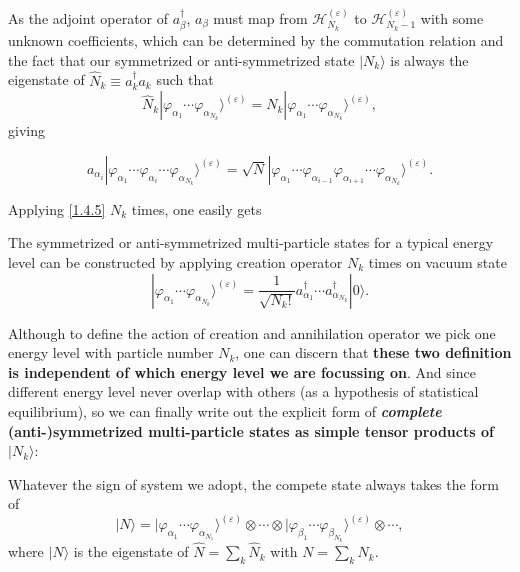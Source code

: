 \documentclass[b5paper,10pt,UTF8]{book}
\numberwithin{equation}{section}
\begin{document}
 		As the adjoint operator of $a^\dagger_\beta$, $a_\beta$ must map from $\mathcal{H}_{N_k}^{(\varepsilon)}$ to $\mathcal{H}_{N_k-1}^{(\varepsilon)}$ with some unknown coefficients, which can be determined by the commutation relation and the fact that our symmetrized or anti-symmetrized state $|N_k\rangle$ is always the eigenstate of $\hat{N}_k\equiv a^\dagger_k a_k$ such that
 		\begin{equation}\label{1.4.4}
 			\hat{N}_k|\varphi_{\alpha_1}\cdots\varphi_{\alpha_{N_k}}\rangle^{(\varepsilon)}=N_k|\varphi_{\alpha_1}\cdots\varphi_{\alpha_{N_k}}\rangle^{(\varepsilon)},
 		\end{equation}
 		giving
 		\begin{Def}
	 		\begin{equation}\label{1.4.5}
 				a_{\alpha_i}|\varphi_{\alpha_1}\cdots\varphi_{\alpha_i}\cdots\varphi_{\alpha_{N_k}}\rangle^{(\varepsilon)}=\sqrt{N}|\varphi_{\alpha_1}\cdots\varphi_{\alpha_{i-1}}\varphi_{\alpha_{i+1}}\cdots\varphi_{\alpha_{N_k}}\rangle^{(\varepsilon)}.
 			\end{equation}
		\end{Def}
		Applying \eqref{1.4.5} $N_k$ times, one easily gets
		\begin{Proposition}
			The symmetrized or anti-symmetrized multi-particle states for a typical energy level can be constructed by applying creation operator $N_k$ times on vacuum state
			\begin{equation}\label{1.4.6}
				|\varphi_{\alpha_1}\cdots\varphi_{\alpha_{N_k}}\rangle^{(\varepsilon)}=\dfrac{1}{\sqrt{N_k!}}a_{\alpha_1}^\dagger\cdots a_{\alpha_{N_k}}^\dagger|0\rangle.
			\end{equation}
		\end{Proposition}
		Although to define the action of creation and annihilation operator we pick one energy level with particle number $N_k$, one can discern that \textbf{these two definition is independent of which energy level we are focussing on}. And since different energy level never overlap with others (as a hypothesis of statistical equilibrium), so we can finally write out the explicit form of \textbf{\emph{complete} (anti-)symmetrized multi-particle states as simple tensor products of $|N_k\rangle$}:
		\begin{Assertion}
			Whatever the sign of system we adopt, the compete state always takes the form of
			\begin{equation}\label{1.4.10}
				|N\rangle=|\varphi_{\alpha_1}\cdots\varphi_{\alpha_{N_1}}\rangle^{(\varepsilon)}\otimes\cdots\otimes|\varphi_{\beta_1}\cdots\varphi_{\beta_{N_k}}\rangle^{(\varepsilon)}\otimes\cdots\nonumber,
			\end{equation}
			where $|N\rangle$ is the eigenstate of $\hat{N}=\sum_k\hat{N}_k$ with $N=\sum_k N_k$.
		\end{Assertion}
\end{document}
